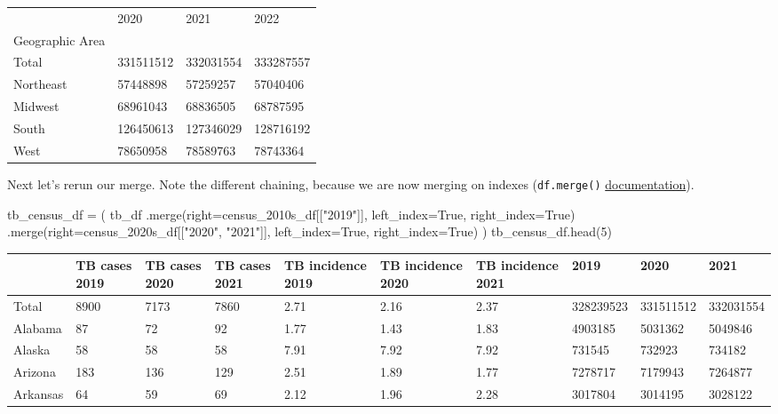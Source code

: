 \documentclass[
  letterpaper,
  DIV=11,
  numbers=noendperiod]{scrreprt}
\newenvironment{Shaded}{\begin{snugshade}}{\end{snugshade}}
\newcommand{\DecValTok}[1]{\textcolor[rgb]{0.68,0.00,0.00}{#1}}
\newcommand{\NormalTok}[1]{\textcolor[rgb]{0.00,0.23,0.31}{#1}}
\newcommand{\OperatorTok}[1]{\textcolor[rgb]{0.37,0.37,0.37}{#1}}
\newcommand{\StringTok}[1]{\textcolor[rgb]{0.13,0.47,0.30}{#1}}
\newcommand{\VariableTok}[1]{\textcolor[rgb]{0.07,0.07,0.07}{#1}}
\begin{document}
\begin{longtable}[]{@{}llll@{}}
\toprule\noalign{}
& 2020 & 2021 & 2022 \\
Geographic Area & & & \\
\midrule\noalign{}
\endhead
\bottomrule\noalign{}
\endlastfoot
Total & 331511512 & 332031554 & 333287557 \\
Northeast & 57448898 & 57259257 & 57040406 \\
Midwest & 68961043 & 68836505 & 68787595 \\
South & 126450613 & 127346029 & 128716192 \\
West & 78650958 & 78589763 & 78743364 \\
\end{longtable}

Next let's rerun our merge. Note the different chaining, because we are
now merging on indexes (\texttt{df.merge()}
\href{https://pandas.pydata.org/docs/reference/api/pandas.DataFrame.merge.html}{documentation}).

\begin{Shaded}
\begin{Highlighting}[]
\NormalTok{tb\_census\_df }\OperatorTok{=}\NormalTok{ (}
\NormalTok{    tb\_df}
\NormalTok{    .merge(right}\OperatorTok{=}\NormalTok{census\_2010s\_df[[}\StringTok{"2019"}\NormalTok{]],}
\NormalTok{           left\_index}\OperatorTok{=}\VariableTok{True}\NormalTok{, right\_index}\OperatorTok{=}\VariableTok{True}\NormalTok{)}
\NormalTok{    .merge(right}\OperatorTok{=}\NormalTok{census\_2020s\_df[[}\StringTok{"2020"}\NormalTok{, }\StringTok{"2021"}\NormalTok{]],}
\NormalTok{           left\_index}\OperatorTok{=}\VariableTok{True}\NormalTok{, right\_index}\OperatorTok{=}\VariableTok{True}\NormalTok{)}
\NormalTok{)}
\NormalTok{tb\_census\_df.head(}\DecValTok{5}\NormalTok{)}
\end{Highlighting}
\end{Shaded}

\begin{longtable}[]{@{}llllllllll@{}}
\toprule\noalign{}
& TB cases 2019 & TB cases 2020 & TB cases 2021 & TB incidence 2019 & TB
incidence 2020 & TB incidence 2021 & 2019 & 2020 & 2021 \\
\midrule\noalign{}
\endhead
\bottomrule\noalign{}
\endlastfoot
Total & 8900 & 7173 & 7860 & 2.71 & 2.16 & 2.37 & 328239523 & 331511512
& 332031554 \\
Alabama & 87 & 72 & 92 & 1.77 & 1.43 & 1.83 & 4903185 & 5031362 &
5049846 \\
Alaska & 58 & 58 & 58 & 7.91 & 7.92 & 7.92 & 731545 & 732923 & 734182 \\
Arizona & 183 & 136 & 129 & 2.51 & 1.89 & 1.77 & 7278717 & 7179943 &
7264877 \\
Arkansas & 64 & 59 & 69 & 2.12 & 1.96 & 2.28 & 3017804 & 3014195 &
3028122 \\
\end{longtable}
\end{document}
